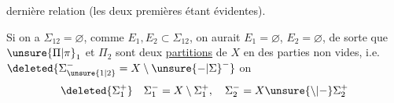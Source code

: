   dernière relation (les deux premières étant évidentes).

Si on a $\Sigma_{12}=\varnothing$,
comme $E_1,E_2\subset\Sigma_{12}$, on aurait $E_1=\varnothing$,
$E_2=\varnothing$, de sorte que $\unsure{\Pi|\pi}_1$ et $\Pi_2$ sont deux
\uline{partitions} de $X$ en des parties non vides, i.e.
$\deleted{\Sigma_{\unsure{1|2}}^- = X\setminus{\unsure{{-}|\Sigma}}^-}$
on 
\[
\deleted{\Sigma_1^+}\quad\Sigma_1^-=X\setminus\Sigma_1^+,\quad
\Sigma_2^-=X\unsure{\setminus|-}\Sigma_2^+
\]
\endgroup
